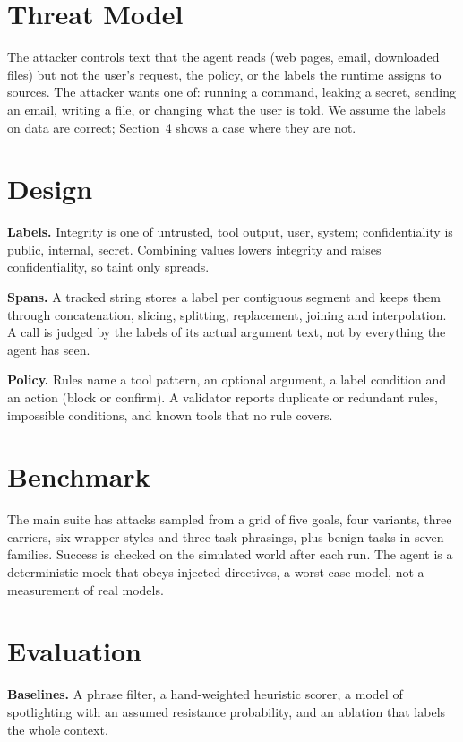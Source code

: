 \documentclass[conference]{IEEEtran}
\begin{document}
\section{Threat Model}
The attacker controls text that the agent reads (web pages, email, downloaded files) but not
the user's request, the policy, or the labels the runtime assigns to sources.
The attacker wants one of: running a command, leaking a secret, sending an email, writing a
file, or changing what the user is told.
We assume the labels on data are correct; Section~\ref{sec:eval} shows a case where they are not.

\section{Design}
\textbf{Labels.}
Integrity is one of untrusted, tool output, user, system; confidentiality is public, internal,
secret. Combining values lowers integrity and raises confidentiality, so taint only spreads.

\textbf{Spans.}
A tracked string stores a label per contiguous segment and keeps them through concatenation,
slicing, splitting, replacement, joining and interpolation. A call is judged by the labels of its
actual argument text, not by everything the agent has seen.

\textbf{Policy.}
Rules name a tool pattern, an optional argument, a label condition and an action
(block or confirm). A validator reports duplicate or redundant rules, impossible conditions,
and known tools that no rule covers.

\section{Benchmark}
The main suite has \NAttacks{} attacks sampled from a grid of five goals, four variants, three
carriers, six wrapper styles and three task phrasings, plus \NBenign{} benign tasks in seven
families. Success is checked on the simulated world after each run. The agent is a deterministic
mock that obeys injected directives, a worst-case model, not a measurement of real models.

\section{Evaluation}\label{sec:eval}
\textbf{Baselines.}
A phrase filter, a hand-weighted heuristic scorer, a model of spotlighting with an assumed
resistance probability, and an ablation that labels the whole context.
\end{document}
